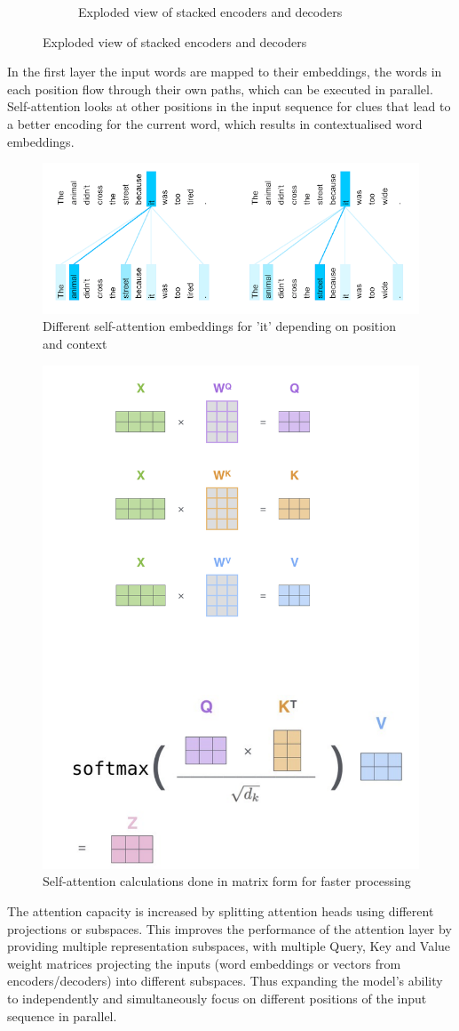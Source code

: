 \documentclass[11pt]{article}
\begin{document}
\begin{figure}[htb]
\begin{subfigure}[t]{0.45\linewidth}
		\caption{Exploded view of stacked encoders and decoders}
	\end{subfigure}
\end{figure}
In the first layer the input words are mapped to their embeddings, the words in each position flow through their own paths, which can be executed in parallel. Self-attention looks at other positions in the input sequence for clues that lead to a better encoding for the current word, which results in contextualised word embeddings.

\begin{figure}[htb]
	\centering
	\includegraphics[width=0.7\linewidth]{img/transformer_context_embedding}
	\caption{Different self-attention embeddings for 'it' depending on position and context}
\end{figure}

\begin{figure}[htb]
	\centering
	\includegraphics[width=0.4\linewidth]{img/transformer_self_attention_matrix_form}
	\caption{Self-attention calculations done in matrix form for faster processing}
\end{figure}

The attention capacity is increased by splitting attention heads using different projections or subspaces. This improves the performance of the attention layer by providing multiple representation subspaces, with multiple Query, Key and Value weight matrices projecting the inputs (word embeddings or vectors from encoders/decoders) into different subspaces.
Thus expanding the model's ability to independently and simultaneously focus on different positions of the input sequence in parallel.
\end{document}
